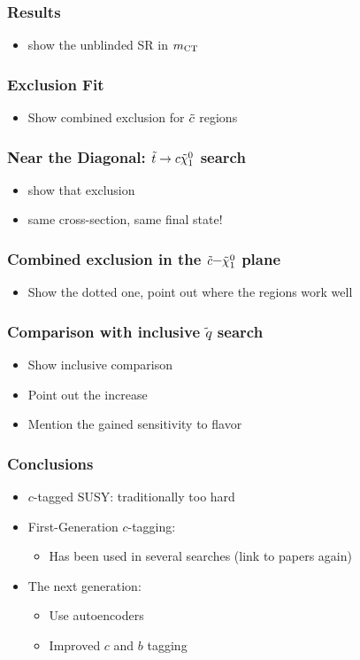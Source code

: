 \documentclass[usenames,dvipsnames]{beamer}
\begin{document}
\begin{frame}
  \frametitle{Results}
  \begin{itemize}
  \item show the unblinded SR in $m_{\rm CT}$
  \end{itemize}
\end{frame}

\begin{frame}
  \frametitle{Exclusion Fit}
  \begin{itemize}
  \item Show combined exclusion for $\tilde{c}$ regions
  \end{itemize}
\end{frame}

\begin{frame}
  \frametitle{Near the Diagonal: $\tilde{t} \to c \tilde{\chi}_1^0$ search}
  \begin{itemize}
    \item show that exclusion
    \item same cross-section, same final state!
  \end{itemize}
\end{frame}

\begin{frame}
  \frametitle{Combined exclusion in the $\tilde{c}$--$\tilde{\chi}_1^0$ plane}
  \begin{itemize}
  \item Show the dotted one, point out where the regions work well
  \end{itemize}
\end{frame}

\begin{frame}
  \frametitle{Comparison with inclusive $\tilde{q}$ search}
  \begin{itemize}
  \item Show inclusive comparison
  \item Point out the increase
  \item Mention the gained sensitivity to flavor
  \end{itemize}
\end{frame}

\begin{frame}
  \frametitle{Conclusions}
  \begin{itemize}
  \item $c$-tagged SUSY: traditionally too hard
  \item First-Generation $c$-tagging:
    \begin{itemize}
    \item Has been used in several searches (link to papers again)
    \end{itemize}
  \item The next generation:
    \begin{itemize}
    \item Use autoencoders
    \item Improved $c$ and $b$ tagging
    \end{itemize}
  \end{itemize}
\end{frame}
\end{document}
